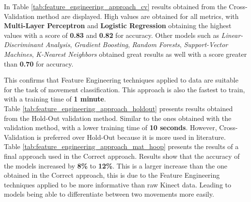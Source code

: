             In Table \ref{tab:feature_engineering_approach_cv} results obtained from the Cross-Validation method are displayed. High values are obtained for all metrics, with \textbf{Multi-Layer Perceptron}  and \textbf{Logistic Regression} obtaining the highest values with a score of \textbf{0.83} and \textbf{0.82} for accuracy. Other models such as \textit{Linear-Discriminant Analysis}, \textit{Gradient Boosting}, \textit{Random Forests}, \textit{Support-Vector Machines}, \textit{K-Nearest Neighbors} obtained great results as well with a score greater than \textbf{0.70} for accuracy. 

            This confirms that Feature Engineering techniques applied to data are suitable for the task of movement classification. This approach is also the fastest to train, with a training time of \textbf{1 minute}. \\

            Table \ref{tab:feature_engineering_approach_holdout} presents results obtained from the Hold-Out validation method. Similar to the ones obtained with the validation method, with a lower training time of \textbf{10 seconds}. However, Cross-Validation is preferred over Hold-Out because it is more used in literature.\\

            Table \ref{tab:feature_engineering_approach_mat_hoop} presents the results of a final approach used in the Correct approach. Results show that the accuracy of the models increased by \textbf{8\%} to \textbf{12\%}. This is a larger increase than the one obtained in the Correct approach, this is due to the Feature Engineering techniques applied to be more informative than raw Kinect data. Leading to models being able to differentiate between two movements more easily. \\

